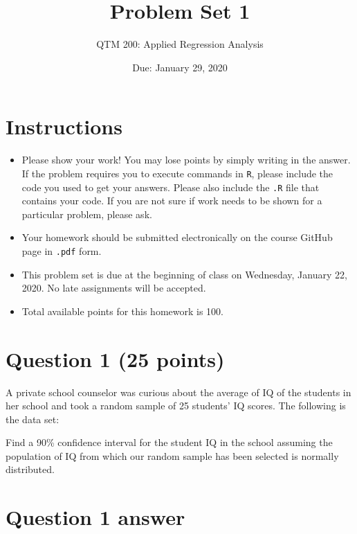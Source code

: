 \documentclass[12pt,letterpaper]{article}
\title{Problem Set 1}
\date{Due: January 29, 2020}
\author{QTM 200: Applied Regression Analysis}
\begin{document}
	\maketitle
	
	\section*{Instructions}
	\begin{itemize}
		\item Please show your work! You may lose points by simply writing in the answer. If the problem requires you to execute commands in \texttt{R}, please include the code you used to get your answers. Please also include the \texttt{.R} file that contains your code. If you are not sure if work needs to be shown for a particular problem, please ask.
		\item Your homework should be submitted electronically on the course GitHub page in \texttt{.pdf} form.
		\item This problem set is due at the beginning of class on Wednesday, January 22, 2020. No late assignments will be accepted.
		\item Total available points for this homework is 100.
	\end{itemize}
	
	\vspace{1cm}
	\section*{Question 1 (25 points)}
	
	A private school counselor was curious about the average of IQ of the students in her school and took a random sample of 25 students' IQ scores. The following is the data set:
	
	\vspace{.5cm}
	
	  
	
	\vspace{.5cm}
	
	\noindent Find a 90\% confidence interval for the student IQ in the school assuming the population of IQ from which our random sample has been selected is normally distributed. 
	
	\section{Question 1 answer}
	  
	
\end{document}

